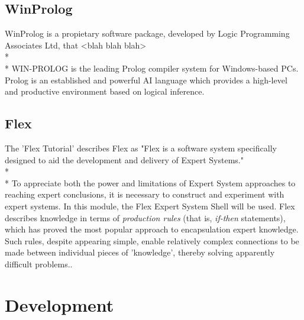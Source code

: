 \documentclass[12pt]{report}
\begin{document}
\subsection{WinProlog}\label{subsec:winprolog}
WinProlog is a propietary software package, developed by Logic Programming Associates Ltd, that <blah blah blah>
\\*
\\*
WIN-PROLOG is the leading Prolog compiler system for Windows-based PCs. Prolog is an established and powerful AI language which provides a high-level and productive environment based on logical inference.\citep{lpawinprolog}

\subsection{Flex}\label{subsec:flex}
The 'Flex Tutorial' describes Flex as "Flex is a software system specifically designed to aid the development and delivery of Expert Systems."
\\*
\\*
To appreciate both the power and limitations of Expert System approaches to reaching expert conclusions, it is necessary to construct and experiment with expert systems.  In this module, the Flex Expert System Shell will be used.  Flex describes knowledge in terms of \textit{production rules} (that is, \textit{if-then} statements), which has proved the most popular approach to encapsulation expert knowledge.  Such rules, despite appearing simple, enable relatively complex connections to be made between individual pieces of 'knowledge', thereby solving apparently difficult problems.\citep{flexsystems09}.


\section{Development}\label{sec:development}
\end{document}
